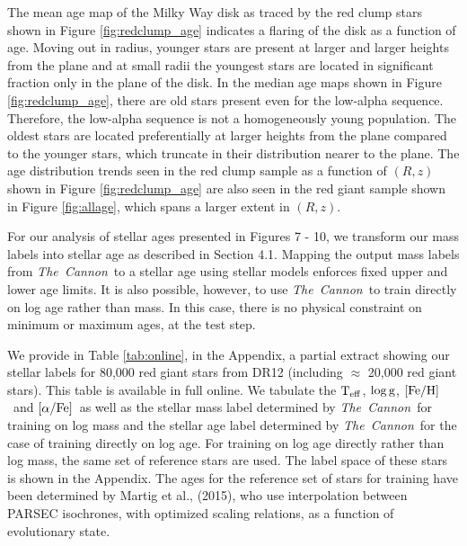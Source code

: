 \documentclass[12pt, preprint]{aastex}
\newcommand{\project}[1]{\textsl{#1}}
\newcommand{\tc}{\project{The~Cannon}}
\newcommand{\apogee}{\project{\textsc{apogee}}}
\newcommand{\teff}{\mbox{$\rm T_{eff}$}}
\newcommand{\feh}{\mbox{$\rm [Fe/H]$}}
\newcommand{\alphafe}{\mbox{$\rm [\alpha/Fe]$}}
\newcommand{\logg}{\mbox{$\rm \log g$}}
\begin{document}
The mean age map of the Milky Way disk as traced by the red clump stars shown in Figure \ref{fig:redclump_age} indicates a flaring of the disk as a function of age. Moving out in radius, younger stars are present at larger and larger heights from the plane and at small radii the youngest stars are located in significant fraction only in the plane of the disk. In the median age maps shown in Figure \ref{fig:redclump_age}, there are old stars present even for the low-alpha sequence. Therefore, the low-alpha sequence is not a homogeneously young population. The oldest stars are located preferentially at larger heights from the plane compared to the younger stars, which truncate in their distribution nearer to the plane. The age distribution trends seen in the red clump sample as a function of $(R,z)$ shown in Figure \ref{fig:redclump_age} are also seen in the red giant sample shown in Figure \ref{fig:allage}, which spans a larger extent in $(R,z)$. %

For our analysis of stellar ages presented in Figures 7 - 10, we transform our mass labels into stellar age as described in Section 4.1. Mapping the output mass labels from \tc\ to a stellar age using stellar models enforces fixed upper and lower age limits. It is also possible, however, to use \tc\ to train directly on log age rather than mass. In this case, there is no physical constraint on minimum or maximum ages, at the test step.  

We provide in Table \ref{tab:online}, in the Appendix,  a partial extract showing our stellar labels for 80,000 red giant stars from DR12 (including $\approx$ 20,000 red giant stars). This table is available in full online. We tabulate the \teff, \logg, \feh\ and \alphafe\ as well as the stellar mass label determined by \tc\ for training on log mass and  the stellar age label determined by \tc\ for the case of training directly on log age. For training on log age directly rather than log mass, the same set of reference stars are used. The label space of these stars is shown in the Appendix. The ages for the reference set of stars for training have been determined by Martig et al., (2015), who use interpolation between PARSEC isochrones, with optimized scaling relations, as a function of evolutionary state. 

\end{document}
